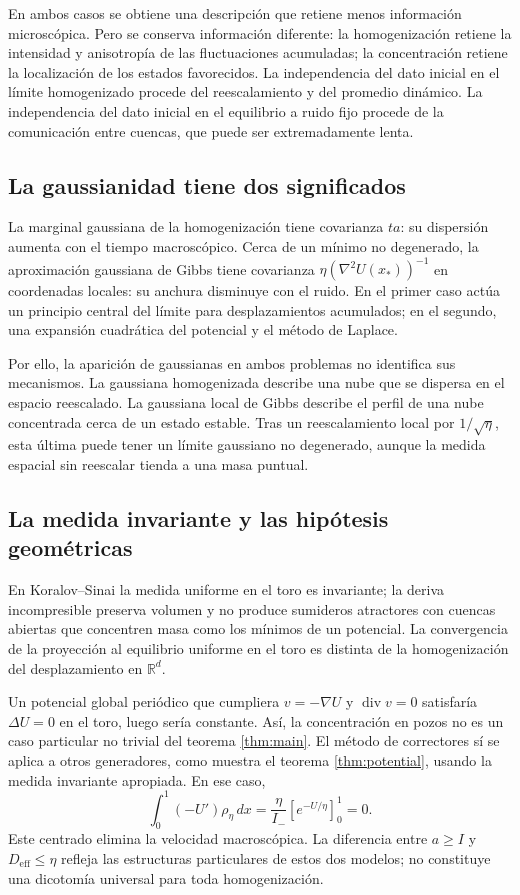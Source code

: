 \documentclass[11pt,a4paper]{article}
\theoremstyle{remark}\newtheorem{remark}{Observación}
\newcommand{\R}{\mathbb R}
\newcommand{\Deff}{D_{\mathrm{eff}}}
\DeclareMathOperator{\diver}{div}
\begin{document}
En ambos casos se obtiene una descripción que retiene menos información microscópica. Pero se conserva información diferente: la homogenización retiene la intensidad y anisotropía de las fluctuaciones acumuladas; la concentración retiene la localización de los estados favorecidos. La independencia del dato inicial en el límite homogenizado procede del reescalamiento y del promedio dinámico. La independencia del dato inicial en el equilibrio a ruido fijo procede de la comunicación entre cuencas, que puede ser extremadamente lenta.

\subsection{La gaussianidad tiene dos significados}
La marginal gaussiana de la homogenización tiene covarianza $ta$: su dispersión aumenta con el tiempo macroscópico. Cerca de un mínimo no degenerado, la aproximación gaussiana de Gibbs tiene covarianza $\eta(\nabla^2U(x_*))^{-1}$ en coordenadas locales: su anchura disminuye con el ruido. En el primer caso actúa un principio central del límite para desplazamientos acumulados; en el segundo, una expansión cuadrática del potencial y el método de Laplace.

Por ello, la aparición de gaussianas en ambos problemas no identifica sus mecanismos. La gaussiana homogenizada describe una nube que se dispersa en el espacio reescalado. La gaussiana local de Gibbs describe el perfil de una nube concentrada cerca de un estado estable. Tras un reescalamiento local por $1/\sqrt\eta$, esta última puede tener un límite gaussiano no degenerado, aunque la medida espacial sin reescalar tienda a una masa puntual.

\subsection{La medida invariante y las hipótesis geométricas}
En Koralov--Sinai la medida uniforme en el toro es invariante; la deriva incompresible preserva volumen y no produce sumideros atractores con cuencas abiertas que concentren masa como los mínimos de un potencial. La convergencia de la proyección al equilibrio uniforme en el toro es distinta de la homogenización del desplazamiento en $\R^d$.

Un potencial global periódico que cumpliera $v=-\nabla U$ y $\diver v=0$ satisfaría $\Delta U=0$ en el toro, luego sería constante. Así, la concentración en pozos no es un caso particular no trivial del teorema \ref{thm:main}. El método de correctores sí se aplica a otros generadores, como muestra el teorema \ref{thm:potential}, usando la medida invariante apropiada. En ese caso,
\[
 \int_0^1(-U')\rho_\eta\,dx
 =\frac{\eta}{I_-}[e^{-U/\eta}]_0^1=0.
\]
Este centrado elimina la velocidad macroscópica. La diferencia entre $a\geq I$ y $\Deff\leq\eta$ refleja las estructuras particulares de estos dos modelos; no constituye una dicotomía universal para toda homogenización.
\end{document}
